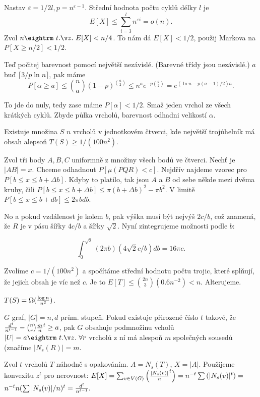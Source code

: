 \prf{} Nastav $\varepsilon = 1/2l, p = n^{\varepsilon-1}$. Střední hodnota počtu cyklů
délky $l$ je $$E[X] \le \sum_{i=3}^l n^{\varepsilon i} = o(n).$$
Zvol $n \st E[X] < n/4$. To nám dá $E[X] < 1/2$, použij Markova na $P[X \ge n/2] < 1/2$.

Teď počitej barevnost pomocí největší nezávislé. (Barevné třídy jsou
nezávislé.) $a$ buď $\lceil 3/p \ln n \rceil$, pak máme
$$P[\alpha \ge a] \le {n \choose a} (1-p)^{{a \choose 2}} \le n^a e^{-p{a \choose 2}} =
e^{(\ln n -p(a-1)/2)a}.$$

To jde do nuly, tedy zase máme $P[\alpha] < 1/2$. Smaž jeden vrchol ze všech
krátkých cyklů.  Zbyde půlka vrcholů, barevnost odhadni velikostí $\alpha$.

\thm{} Existuje množina $S$ $n$ vrcholů v jednotkovém čtverci, kde
největší trojúhelník má obsah alepsoň $T(S) \ge 1/(100n^2)$.

\prf{} Zvol tři body $A,B,C$ uniformně z množiny všech bodů ve
čtverci. Nechť je $|AB| = x$. Chceme odhadnout $P[\mu(PQR) < c]$.
Nejdřív najdeme vzorec pro $P[b \le x \le b + \Delta b]$. Kdyby to
platilo, tak jsou $A$ a $B$ od sebe někde mezi dvěma kruhy, čili $P[b
\le x \le b + \Delta b] \le \pi(b+\Delta b)^2 - \pi b^2$. V limitě
$P[b \le x \le b + db] \le 2\pi b db$.

No a pokud vzdálenost je kolem $b$, pak výška musí být nejvýš $2c/b$,
což znamená, že $R$ je v pásu šířky $4c/b$ a šířky $\sqrt{2}$. Nyní
zintegrujeme možnosti podle $b$:

$$ \int_0^{\sqrt{2}}(2 \pi b)(4 \sqrt{2} c / b) db = 16 \pi c. $$ 

Zvolíme $c = 1/(100n^2)$ a spočítáme střední hodnotu počtu trojic,
které splňují, že jejich obsah je víc než $c$. Je to $E[T] \le {2n
\choose 3}(0.6n^{-2}) < n$. Alterujeme.

 $T(S) = \Omega({\log n \over n^2})$.
 

 $G$ graf, $|G| = n, d$ prům. stupeň. Pokud existuje
přirozené číslo $t$ takové, že ${d^t \over n^{t-1}} - {n \choose r} {m \over
n}^t \ge a$, pak $G$ obsahuje podmnožinu vcholů $|U|=a \st \forall r$ vrcholů z
ní má alespoň $m$ společných sousedů (značíme $|N_s(R)| = m$.

\prf{} Zvol $t$ vrcholů $T$ náhodně s opakováním. $A = N_s(T)$, $X = |A|$. Použijeme
konvexitu $z^t$ pro nerovnost:
$E[X] = \sum_{v \in V(G)} \left({ |N_s(v)| \over n}^t\right) = n^{-t} \sum \left(|N_s(v)|^t\right) =$ $n^{-t} n (\sum |N_s(v)|/n)^t
= {d^t \over n^{t-1}}.$


